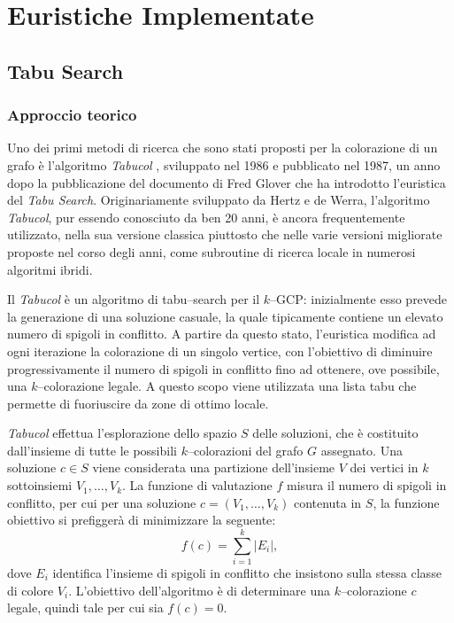\documentclass[a4paper,10pt]{article}
\newcommand{\tabucol}{\emph{Tabucol}}
\begin{document}
\section{Euristiche Implementate}
\subsection{Tabu Search}
\subsubsection{Approccio teorico}
Uno dei primi metodi di ricerca che sono stati proposti per la colorazione di un grafo è l'algoritmo \tabucol{}  \cite{tabucol}, sviluppato nel 1986 e pubblicato nel 1987, un anno dopo la pubblicazione del documento di Fred Glover \cite{tabusearch} che ha introdotto l'euristica del \emph{Tabu Search}. Originariamente sviluppato da Hertz e de Werra, l'algoritmo \tabucol, pur essendo conosciuto da ben 20 anni, è ancora frequentemente utilizzato, nella sua versione classica piuttosto che nelle varie versioni migliorate proposte nel corso degli anni\cite{tabucolimproved}, come subroutine di ricerca locale in numerosi algoritmi ibridi.

Il \tabucol{} è un algoritmo di tabu--search per il $k$--GCP: inizialmente esso prevede la generazione di una soluzione casuale, la quale tipicamente contiene un elevato numero di spigoli in conflitto. A partire da questo stato, l'euristica modifica ad ogni iterazione la colorazione di un singolo vertice, con l'obiettivo di diminuire progressivamente il numero di spigoli in conflitto fino ad ottenere, ove possibile, una $k$--colorazione legale. A questo scopo viene utilizzata una lista tabu che permette di fuoriuscire da zone di ottimo locale.

\tabucol{} effettua l'esplorazione dello spazio $S$ delle soluzioni, che è costituito dall'insieme di tutte le possibili $k$--colorazioni del grafo $G$ assegnato. Una soluzione $c\in S$ viene considerata una partizione dell'insieme $V$ dei vertici in $k$ sottoinsiemi $V_{1},\ldots,V_{k}$. La funzione di valutazione $f$ misura il numero di spigoli in conflitto, per cui per una soluzione $c=(V_{1},\ldots,V_{k})$ contenuta in $S$, la funzione obiettivo si prefiggerà di minimizzare la seguente:
\begin{displaymath}
f(c)=\sum_{i=1}^{k}|E_{i}|, 
\end{displaymath}
dove $E_{i}$ identifica l'insieme di spigoli in conflitto che insistono sulla stessa classe di colore $V_{i}$. L'obiettivo dell'algoritmo è di determinare una $k$--colorazione $c$ legale, quindi tale per cui sia $f(c)=0$. 
\end{document}
